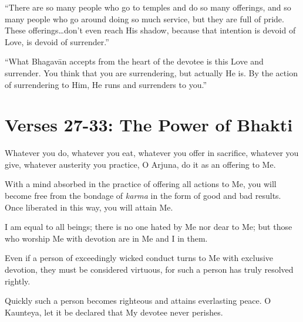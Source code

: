 \enquote{There are so many people who go to temples and do so many offerings, and so many people who go around doing so much service, but they are full of pride. These offerings\ldots don’t even reach His shadow, because that intention is devoid of Love, is devoid of surrender.}

\enquote{What Bhagavān accepts from the heart of the devotee is this Love and surrender. You think that you are surrendering, but actually He is. By the action of surrendering to Him, He runs and surrenders to you.}

\section{Verses 27-33: The Power of Bhakti}\label{sec-verses-27-33-the-power-of-bhakti}

{Whatever you do, whatever you eat, whatever you offer in sacrifice, whatever you give, whatever austerity you practice, O Arjuna, do it as an offering to Me.}

{With a mind absorbed in the practice of offering all actions to Me, you will become free from the bondage of \textit{karma} in the form of good and bad results. Once liberated in this way, you will attain Me.}

{I am equal to all beings; there is no one hated by Me nor dear to Me; but those who worship Me with devotion are in Me and I in them.}

{Even if a person of exceedingly wicked conduct turns to Me with exclusive devotion, they must be considered virtuous, for such a person has truly resolved rightly.}

{Quickly such a person becomes righteous and attains everlasting peace. O Kaunteya, let it be declared that My devotee never perishes.}


